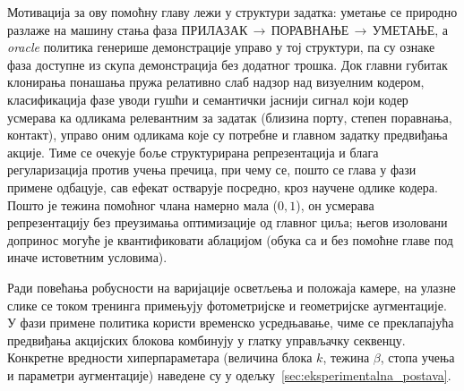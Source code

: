 \documentclass[12pt, a4paper]{article}
\begin{document}
Мотивација за ову помоћну главу лежи у структури задатка: уметање се природно разлаже на машину стања фаза ПРИЛАЗАК\,$\to$\,ПОРАВНАЊЕ\,$\to$\,УМЕТАЊЕ, а \textit{oracle} политика генерише демонстрације управо у тој структури, па су ознаке фаза доступне из скупа демонстрација без додатног трошка.
Док главни губитак клонирања понашања пружа релативно слаб надзор над визуелним кодером, класификација фазе уводи гушћи и семантички јаснији сигнал који кодер усмерава ка одликама релевантним за задатак (близина порту, степен поравнања, контакт), управо оним одликама које су потребне и главном задатку предвиђања акције.
Тиме се очекује боље структурирана репрезентација и блага регуларизација против учења пречица, при чему се, пошто се глава у фази примене одбацује, сав ефекат остварује посредно, кроз научене одлике кодера.
Пошто је тежина помоћног члана намерно мала ($0{,}1$), он усмерава репрезентацију без преузимања оптимизације од главног циља; његов изоловани допринос могуће је квантификовати аблацијом (обука са и без помоћне главе под иначе истоветним условима).

Ради повећања робусности на варијације осветљења и положаја камере, на улазне слике се током тренинга примењују фотометријске и геометријске аугментације.
У фази примене политика користи временско усредњавање, чиме се преклапајућа предвиђања акцијских блокова комбинују у глатку управљачку секвенцу.
Конкретне вредности хиперпараметара (величина блока $k$, тежина $\beta$, стопа учења и параметри аугментације) наведене су у одељку~\ref{sec:eksperimentalna_postava}.
\end{document}
